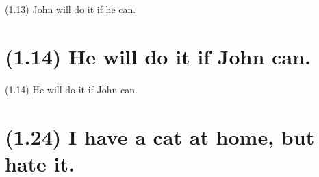 \documentclass{article}
\begin{document}
\bigbreak
\begin{enumerate*}
\item[(1.13)] John will do it if he can.
\end{enumerate*}
\bigbreak

\bigbreak
\begin{minipage}{\textwidth}
\end{minipage}
\bigbreak

\clearpage

%
%

\section*{(1.14) He will do it if John can.}

\bigbreak
\begin{enumerate*}
\item[(1.14)] He will do it if John can.
\end{enumerate*}
\bigbreak

\bigbreak
\begin{minipage}{\textwidth}
\end{minipage}
\bigbreak

\clearpage

%
%

\section*{(1.24) I have a cat at home, but hate it.}
\end{document}
